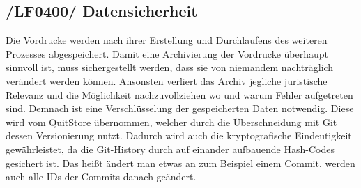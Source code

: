 \subsection{/LF0400/ Datensicherheit}
Die Vordrucke werden nach ihrer Erstellung und Durchlaufens des weiteren Prozesses abgespeichert.
Damit eine Archivierung der Vordrucke überhaupt sinnvoll ist, muss sichergestellt werden, dass sie von niemandem  
nachträglich verändert werden können. Ansonsten verliert das Archiv jegliche juristische Relevanz und die Möglichkeit nachzuvollziehen wo und warum Fehler aufgetreten sind. Demnach ist eine Verschlüsselung der gespeicherten Daten notwendig. Diese wird vom QuitStore übernommen, welcher durch die Überschneidung mit Git dessen Versionierung nutzt. Dadurch wird auch die kryptografische Eindeutigkeit gewährleistet, da die Git-History durch auf einander aufbauende Hash-Codes gesichert ist. Das heißt ändert man etwas an zum Beispiel einem Commit, werden auch alle IDs der Commits danach geändert.